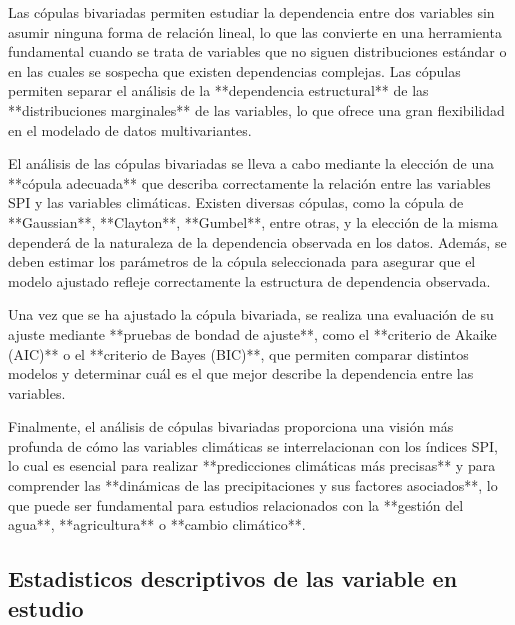 Las cópulas bivariadas permiten estudiar la dependencia entre dos variables sin asumir ninguna forma de relación lineal, lo que las convierte en una herramienta fundamental cuando se trata de variables que no siguen distribuciones estándar o en las cuales se sospecha que existen dependencias complejas. Las cópulas permiten separar el análisis de la **dependencia estructural** de las **distribuciones marginales** de las variables, lo que ofrece una gran flexibilidad en el modelado de datos multivariantes.

El análisis de las cópulas bivariadas se lleva a cabo mediante la elección de una **cópula adecuada** que describa correctamente la relación entre las variables SPI y las variables climáticas. Existen diversas cópulas, como la cópula de **Gaussian**, **Clayton**, **Gumbel**, entre otras, y la elección de la misma dependerá de la naturaleza de la dependencia observada en los datos. Además, se deben estimar los parámetros de la cópula seleccionada para asegurar que el modelo ajustado refleje correctamente la estructura de dependencia observada.

Una vez que se ha ajustado la cópula bivariada, se realiza una evaluación de su ajuste mediante **pruebas de bondad de ajuste**, como el **criterio de Akaike (AIC)** o el **criterio de Bayes (BIC)**, que permiten comparar distintos modelos y determinar cuál es el que mejor describe la dependencia entre las variables.

Finalmente, el análisis de cópulas bivariadas proporciona una visión más profunda de cómo las variables climáticas se interrelacionan con los índices SPI, lo cual es esencial para realizar **predicciones climáticas más precisas** y para comprender las **dinámicas de las precipitaciones y sus factores asociados**, lo que puede ser fundamental para estudios relacionados con la **gestión del agua**, **agricultura** o **cambio climático**.

\subsection{Estadisticos descriptivos de las variable en estudio}


